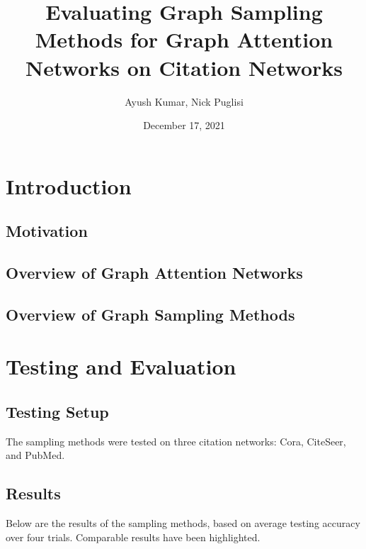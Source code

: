\documentclass{article}
\title{Evaluating Graph Sampling Methods for Graph Attention Networks on Citation Networks}
\author{Ayush Kumar, Nick Puglisi}
\date{December 17, 2021}
\begin{document}
	\maketitle
	\tableofcontents
	\pagebreak
	\section{Introduction}
	\subsection{Motivation}
	\subsection{Overview of Graph Attention Networks}
	\subsection{Overview of Graph Sampling Methods} 
	
	\section{Testing and Evaluation}
	\subsection{Testing Setup}
	
	The sampling methods were tested on three citation networks: Cora, CiteSeer, and PubMed. 
	
	\subsection{Results}
	
	Below are the results of the sampling methods, based on average testing accuracy over four trials. Comparable results have been highlighted.
\end{document}
